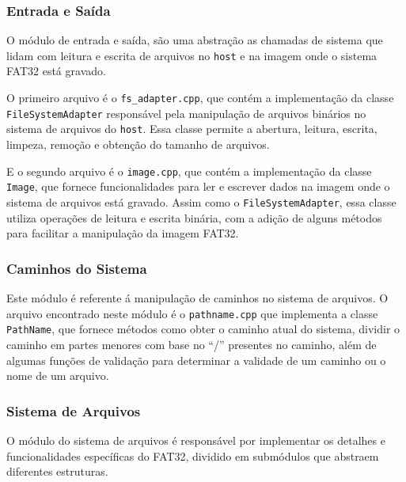 \documentclass[
    12pt,				%
    oneside,   	        %
    a4paper,			%
    english,			%
    french,				%
    spanish,			%
    brazil,				%
    ]{pacotes/abntex2}
\begin{document}
\subsubsection{Entrada e Saída}
\label{subsubsec:io}

O módulo de entrada e saída, são uma abstração as chamadas de sistema que lidam com leitura e escrita de arquivos no \texttt{host} e na imagem onde o sistema FAT32 está gravado.

O primeiro arquivo é o \texttt{fs\_adapter.cpp}, que contém a implementação da classe \texttt{FileSystemAdapter} responsável pela manipulação de arquivos binários no sistema de arquivos do \texttt{host}. Essa classe permite a abertura, leitura, escrita, limpeza, remoção e obtenção do tamanho de arquivos.

E o segundo arquivo é o \texttt{image.cpp}, que contém a implementação da classe \texttt{Image}, que fornece funcionalidades para ler e escrever dados na imagem onde o sistema de arquivos está gravado. Assim como o \texttt{FileSystemAdapter}, essa classe utiliza operações de leitura e escrita binária, com a adição de alguns métodos para facilitar a manipulação da imagem FAT32.

\subsubsection{Caminhos do Sistema}
\label{subsubsec:parser}

Este módulo é referente á manipulação de caminhos no sistema de arquivos. O arquivo encontrado neste módulo é o \texttt{pathname.cpp} que implementa a classe \texttt{PathName}, que fornece métodos como obter o caminho atual do sistema, dividir o caminho em partes menores com base no ``/'' presentes no caminho, além de algumas funções de validação para determinar a validade de um caminho ou o nome de um arquivo.  

\subsubsection{Sistema de Arquivos}
\label{subsubsec:fs}

O módulo do sistema de arquivos é responsável por implementar os detalhes e funcionalidades específicas do FAT32, dividido em submódulos que abstraem diferentes estruturas.
\end{document}
